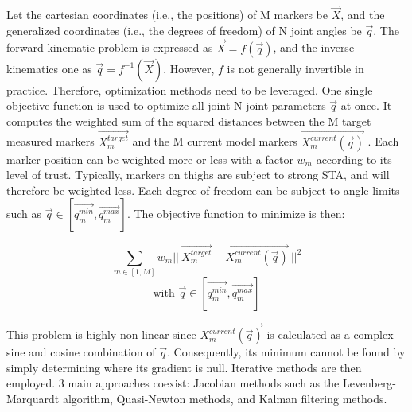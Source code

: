 Let the cartesian coordinates (i.e., the positions) of M markers be $\overrightarrow{X}$, and the generalized coordinates (i.e., the degrees of freedom) of N joint angles be $\overrightarrow{q}$. The forward kinematic problem is expressed as $\overrightarrow{X}=f(\overrightarrow{q})$, and the inverse kinematics one as $\overrightarrow{q}=f^{-1}(\overrightarrow{X})$. However, $f$ is not generally invertible in practice. Therefore, optimization methods need to be leveraged. One single objective function is used to optimize all joint N joint parameters $\overrightarrow{q}$ at once. It computes the weighted sum of the squared distances between the M target measured markers $\overrightarrow{X^{target}_m}$ and the M current model markers $\overrightarrow{X^{current}_m(\overrightarrow{q})}$ \cite{Lu1999}. Each marker position can be weighted more or less with a factor $w_m$ according to its level of trust. Typically, markers on thighs are subject to strong STA, and will therefore be weighted less. Each degree of freedom can be subject to angle limits such as $\overrightarrow{q} \in [ \overrightarrow{q_m^{min}},\overrightarrow{q_m^{max}} ]$. The objective function to minimize is then:

\begin{equation}\label{eq_obj_ik}
  \sum_{m \in [1,M]}
  w_m || \  \overrightarrow{X^{target}_m} - \overrightarrow{X^{current}_m(\overrightarrow{q})} \ ||^2
\end{equation}
\begin{equation*}
  \text{with } \overrightarrow{q} \in [ \overrightarrow{q_m^{min}},\overrightarrow{q_m^{max}} ]
\end{equation*} 

This problem is highly non-linear since $\overrightarrow{X^{current}_m(\overrightarrow{q})}$ is calculated as a complex sine and cosine combination of $\overrightarrow{q}$. Consequently, its minimum cannot be found by simply determining where its gradient is null. Iterative methods are then employed. 3 main approaches coexist: Jacobian methods such as the Levenberg-Marquardt algorithm, Quasi-Newton methods, and Kalman filtering methods.


